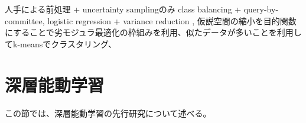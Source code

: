 人手による前処理 + uncertainty samplingのみ\cite{nalisnik2017interactive}
class balancing + query-by-committee\cite{doyle2011active}, 
logistic regression + variance reduction \cite{padmanabhan2014active},
仮説空間の縮小を目的関数にすることで劣モジュラ最適化の枠組みを利用、似たデータが多いことを利用してk-meansでクラスタリング\cite{zhu2014scalable}、


\section{深層能動学習}

この節では、深層能動学習の先行研究について述べる。


